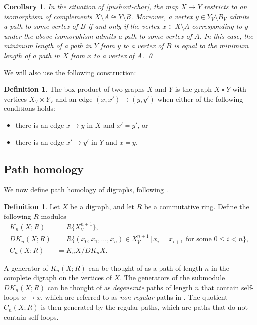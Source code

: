 \documentclass[11pt]{article}
\newtheorem{corollary}[theo]{Corollary}
\theoremstyle{definition}
\newtheorem{defi}[theo]{Definition}
\numberwithin{equation}{section}
\newcommand{\gtimes}{\mathbin{\square}}
\begin{document}
\begin{corollary}\label{pushout-complement}
In the situation of \cref{pushout-char}, the map $X \to Y$ restricts to an isomorphism of complements $X \setminus A \cong Y \setminus B$. 
Moreover, a vertex $y \in Y_V \setminus B_V$ admits a path to some vertex of $B$ if and only if the vertex $x \in X \setminus A$ corresponding to $y$ under the above isomorphism admits a path to some vertex of $A$. In this case, the minimum length of a path in $Y$ from $y$ to a vertex of $B$ is equal to the minimum length of a path in $X$ from $x$ to a vertex of $A$. \qed
\end{corollary}
We will also use the following construction:
\begin{defi}
    The box product of two graphs $X$ and $Y$ is the graph $X \gtimes Y$ with vertices $X_V \times Y_V$
    and an edge $(x,x') \to (y,y')$ when either of the following conditions holds:
    \begin{itemize}
        \item there is an edge $x \to y$ in $X$ and $x' = y'$, or
        \item there is an edge $x' \to y'$ in $Y$ and $x = y$.
    \end{itemize}
\end{defi}

\subsection{Path homology}

We now define path homology of digraphs, following \cite{grigor'yan-lin-muranov-yau:unpublished,grigor'yan-lin-muranov-yau:homotopy}. 

\begin{defi} \label{def:chain-all-paths}
Let $X$ be a digraph, and let $R$ be a commutative ring.
Define the following $R$-modules
\begin{align*}
    K_n (X ; R) &= R \{X_V^{n+1}\}, \\
    DK_n (X ; R) &= R \{ (x_0, x_1, \dots, x_n ) \in X_V^{n+1} \,|\, x_i = x_{i+1} \text{ for some } 0 \leq i < n \}, \\
    C_n (X ; R) & = K_n X / DK_n X.
\end{align*}
\end{defi}

A generator of $K_n (X ; R)$ can be thought of as a path of length $n$ in the complete digraph on the vertices of $X$.
The generators of the submodule $DK_n (X ; R)$ can be thought of as \emph{degenerate} paths of length $n$ that contain self-loops $x \to x$, which are referred to as \emph{non-regular} paths in \cite[\S2.3]{grigor'yan-lin-muranov-yau:unpublished}.
The quotient $C_n (X ; R)$ is then generated by the regular paths, which are paths that do not contain self-loops.
\end{document}

